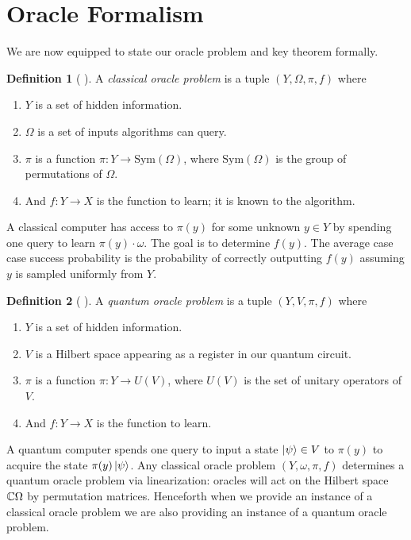 \documentclass[12pt,twoside]{reedthesis}
\theoremstyle{plain}   %
\theoremstyle{definition}
\newtheorem{defn}{Definition}[section]
\theoremstyle{remark}
\numberwithin{equation}{section}
\def\Sym{\mathrm{Sym}}
\begin{document}
  \section{Oracle Formalism}
  We are now equipped to state our oracle problem and key theorem formally.
  \begin{defn}[{ \cite[Section 2]{copeland} }]
    A \emph{classical oracle problem} is a tuple $(Y, \Omega, \pi, f)$ where
    \begin{enumerate}
    \item $Y$ is a set of hidden information.
    \item $\Omega$ is a set of inputs algorithms can query.
    \item $\pi$ is a function $\pi: Y \to \Sym(\Omega )$, where $\Sym(\Omega)$ is the group of permutations of $\Omega$.
    \item And $f: Y \to X$ is the function to learn; it is known to the algorithm. 
    \end{enumerate}
    A classical computer has access to $\pi(y)$ for some unknown $y \in Y$ by spending one query to learn $\pi(y) \cdot \omega$.
    The goal is to determine $f(y)$.
    The average case case success probability is the probability of correctly outputting $f(y)$ assuming $y$ is sampled uniformly from $Y$.
  \end{defn}
  \begin{defn}[{ \cite[Section 2]{copeland} }]
    A \emph{quantum oracle problem} is a tuple $(Y, V, \pi, f)$ where
    \begin{enumerate}
    \item $Y$ is a set of hidden information.
    \item $V$ is a Hilbert space appearing as a register in our quantum circuit.
    \item $\pi$ is a function $\pi: Y \to U(V)$, where $U(V)$ is the set of unitary operators of $V$.
    \item And $f: Y \to X$ is the function to learn.
    \end{enumerate}
    A quantum computer spends one query to input a state $\ket{\psi} \in V$ to $\pi(y)$ to acquire the state $\pi(y) \ket{\psi}$.
    Any classical oracle problem $(Y,\omega, \pi, f)$ determines a quantum oracle problem via linearization:
    oracles will act on the Hilbert space $\mathbb{C} \Omega$  by permutation matrices.
    Henceforth when we provide an instance of a classical oracle problem we are also providing an instance of a quantum oracle problem.
  \end{defn}
\end{document}
